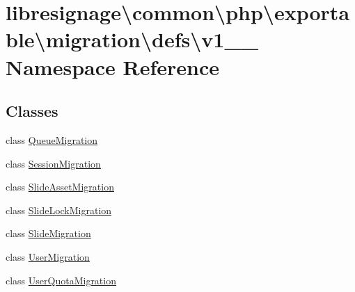 \hypertarget{namespacelibresignage_1_1common_1_1php_1_1exportable_1_1migration_1_1defs_1_1v1__0__0}{}\section{libresignage\textbackslash{}common\textbackslash{}php\textbackslash{}exportable\textbackslash{}migration\textbackslash{}defs\textbackslash{}v1\+\_\+\_ Namespace Reference}
\label{namespacelibresignage_1_1common_1_1php_1_1exportable_1_1migration_1_1defs_1_1v1__0__0}
\subsection*{Classes}
\begin{DoxyCompactItemize}
\item 
class \hyperlink{classlibresignage_1_1common_1_1php_1_1exportable_1_1migration_1_1defs_1_1v1__0__0_1_1QueueMigration}{Queue\+Migration}
\item 
class \hyperlink{classlibresignage_1_1common_1_1php_1_1exportable_1_1migration_1_1defs_1_1v1__0__0_1_1SessionMigration}{Session\+Migration}
\item 
class \hyperlink{classlibresignage_1_1common_1_1php_1_1exportable_1_1migration_1_1defs_1_1v1__0__0_1_1SlideAssetMigration}{Slide\+Asset\+Migration}
\item 
class \hyperlink{classlibresignage_1_1common_1_1php_1_1exportable_1_1migration_1_1defs_1_1v1__0__0_1_1SlideLockMigration}{Slide\+Lock\+Migration}
\item 
class \hyperlink{classlibresignage_1_1common_1_1php_1_1exportable_1_1migration_1_1defs_1_1v1__0__0_1_1SlideMigration}{Slide\+Migration}
\item 
class \hyperlink{classlibresignage_1_1common_1_1php_1_1exportable_1_1migration_1_1defs_1_1v1__0__0_1_1UserMigration}{User\+Migration}
\item 
class \hyperlink{classlibresignage_1_1common_1_1php_1_1exportable_1_1migration_1_1defs_1_1v1__0__0_1_1UserQuotaMigration}{User\+Quota\+Migration}
\end{DoxyCompactItemize}
